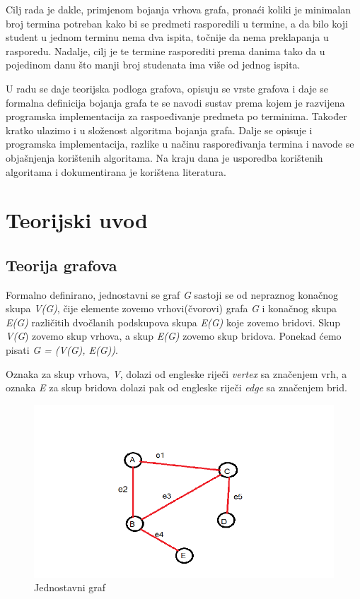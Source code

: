 \documentclass[times, utf8, zavrsni, numeric]{fer}
\begin{document}
Cilj rada je dakle, primjenom bojanja vrhova grafa, pronaći koliki je minimalan broj termina potreban kako bi se predmeti rasporedili u termine, a da bilo koji student u jednom terminu nema dva ispita, točnije da nema preklapanja u rasporedu. Nadalje, cilj je te termine rasporediti prema danima tako da u pojedinom danu što manji broj studenata ima više od jednog ispita.\par
U radu se daje teorijska podloga grafova, opisuju se vrste grafova i daje se formalna definicija bojanja grafa te se navodi sustav prema kojem je razvijena programska implementacija za raspoeđivanje predmeta po terminima. Također kratko ulazimo i u složenost algoritma bojanja grafa. Dalje se opisuje i programska implementacija, razlike u načinu raspoređivanja termina i navode se objašnjenja korištenih algoritama. Na kraju dana je usporedba korištenih algoritama i dokumentirana je korištena literatura.

\chapter{Teorijski uvod}
 

\section{Teorija grafova}
\label{sec:teorijaGrafova}
Formalno definirano, jednostavni se graf \textit{G} sastoji se od nepraznog konačnog skupa \textit{V(G)}, čije elemente zovemo vrhovi(čvorovi) grafa \textit{G} i konačnog skupa \textit{E(G)} različitih dvočlanih podskupova skupa \textit{E(G)} koje zovemo bridovi. Skup \textit{V(G}) zovemo skup vrhova, a skup \textit{E(G)} zovemo skup bridova. Ponekad ćemo pisati \textit{G = (V(G), E(G))}.

Oznaka za skup vrhova, \textit{V}, dolazi od engleske riječi \textit{vertex} sa značenjem vrh, a oznaka \textit{E} za
skup bridova dolazi pak od engleske riječi \textit{edge} sa značenjem brid.

\begin{figure}[h]
	\centering
	\includegraphics[width=0.8\columnwidth]{slike/graf.png}
	\caption{Jednostavni graf}
	\label{fig:graf}
\end{figure}
\end{document}
